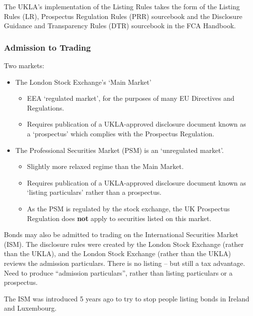 \documentclass[
]{article}
\providecommand{\tightlist}{%
  \setlength{\itemsep}{0pt}\setlength{\parskip}{0pt}}
\begin{document}
The UKLA's implementation of the Listing Rules takes the form of the
Listing Rules (LR), Prospectus Regulation Rules (PRR) sourcebook and the
Disclosure Guidance and Transparency Rules (DTR) sourcebook in the FCA
Handbook.

\hypertarget{admission-to-trading}{%
\subsubsection{Admission to Trading}\label{admission-to-trading}}

Two markets:

\begin{itemize}
\tightlist
\item
  The London Stock Exchange's `Main Market'

  \begin{itemize}
  \tightlist
  \item
    EEA `regulated market', for the purposes of many EU Directives and
    Regulations.
  \item
    Requires publication of a UKLA-approved disclosure document known as
    a `prospectus' which complies with the Prospectus Regulation.
  \end{itemize}
\item
  The Professional Securities Market (PSM) is an `unregulated market'.

  \begin{itemize}
  \tightlist
  \item
    Slightly more relaxed regime than the Main Market.
  \item
    Requires publication of a UKLA-approved disclosure document known as
    `listing particulars' rather than a prospectus.
  \item
    As the PSM is regulated by the stock exchange, the UK Prospectus
    Regulation does \textbf{not} apply to securities listed on this
    market.
  \end{itemize}
\end{itemize}

Bonds may also be admitted to trading on the International Securities
Market (ISM). The disclosure rules were created by the London Stock
Exchange (rather than the UKLA), and the London Stock Exchange (rather
than the UKLA) reviews the admission particulars. There is no listing --
but still a tax advantage. Need to produce ``admission particulars'',
rather than listing particulars or a prospectus.

The ISM was introduced 5 years ago to try to stop people listing bonds
in Ireland and Luxembourg.
\end{document}
